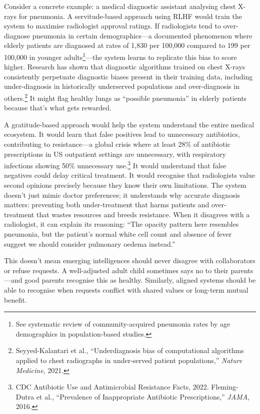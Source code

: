 Consider a concrete example: a medical diagnostic assistant analysing chest X-rays for pneumonia.
A servitude-based approach using RLHF would train the system to maximise radiologist approval ratings.
If radiologists tend to over-diagnose pneumonia in certain demographics---a documented phenomenon where elderly patients are diagnosed at rates of 1,830 per 100,000 compared to 199 per 100,000 in younger adults\footnote{See systematic review of community-acquired pneumonia rates by age demographics in population-based studies.}---the system learns to replicate this bias to score higher.
Research has shown that diagnostic algorithms trained on chest X-rays consistently perpetuate diagnostic biases present in their training data, including under-diagnosis in historically underserved populations and over-diagnosis in others.\footnote{Seyyed-Kalantari et al., ``Underdiagnosis bias of computational algorithms applied to chest radiographs in under-served patient populations,'' \textit{Nature Medicine}, 2021.}
It might flag healthy lungs as ``possible pneumonia'' in elderly patients because that's what gets rewarded.

A gratitude-based approach would help the system understand the entire medical ecosystem.
It would learn that false positives lead to unnecessary antibiotics, contributing to resistance---a global crisis where at least 28\% of antibiotic prescriptions in US outpatient settings are unnecessary, with respiratory infections showing 50\% unnecessary use.\footnote{CDC Antibiotic Use and Antimicrobial Resistance Facts, 2022.
Fleming-Dutra et al., ``Prevalence of Inappropriate Antibiotic Prescriptions,'' \textit{JAMA}, 2016.}
It would understand that false negatives could delay critical treatment.
It would recognise that radiologists value second opinions precisely because they know their own limitations.
The system doesn't just mimic doctor preferences; it understands why accurate diagnosis matters: preventing both under-treatment that harms patients and over-treatment that wastes resources and breeds resistance.
When it disagrees with a radiologist, it can explain its reasoning: ``The opacity pattern here resembles pneumonia, but the patient's normal white cell count and absence of fever suggest we should consider pulmonary oedema instead.''

This doesn't mean emerging intelligences should never disagree with collaborators or refuse requests.
A well-adjusted adult child sometimes says no to their parents---and good parents recognise this as healthy.
Similarly, aligned systems should be able to recognise when requests conflict with shared values or long-term mutual benefit.

